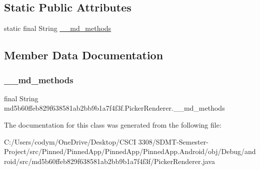 \subsection*{Static Public Attributes}
\begin{DoxyCompactItemize}
\item 
static final String \hyperlink{classmd5b60ffeb829f638581ab2bb9b1a7f4f3f_1_1_picker_renderer_a8a968a337192314e31ec4d605077182c}{\+\_\+\+\_\+md\+\_\+methods}
\end{DoxyCompactItemize}


\subsection{Member Data Documentation}
\mbox{\label{classmd5b60ffeb829f638581ab2bb9b1a7f4f3f_1_1_picker_renderer_a8a968a337192314e31ec4d605077182c}} 
\subsubsection{\texorpdfstring{\+\_\+\+\_\+md\+\_\+methods}{\_\_md\_methods}}
{\footnotesize\ttfamily final String md5b60ffeb829f638581ab2bb9b1a7f4f3f.\+Picker\+Renderer.\+\_\+\+\_\+md\+\_\+methods\hspace{0.3cm}{\ttfamily [static]}}



The documentation for this class was generated from the following file\+:\begin{DoxyCompactItemize}
\item 
C\+:/\+Users/codym/\+One\+Drive/\+Desktop/\+C\+S\+C\+I 3308/\+S\+D\+M\+T-\/\+Semester-\/\+Project/src/\+Pinned/\+Pinned\+App/\+Pinned\+App/\+Pinned\+App.\+Android/obj/\+Debug/android/src/md5b60ffeb829f638581ab2bb9b1a7f4f3f/Picker\+Renderer.\+java\end{DoxyCompactItemize}
